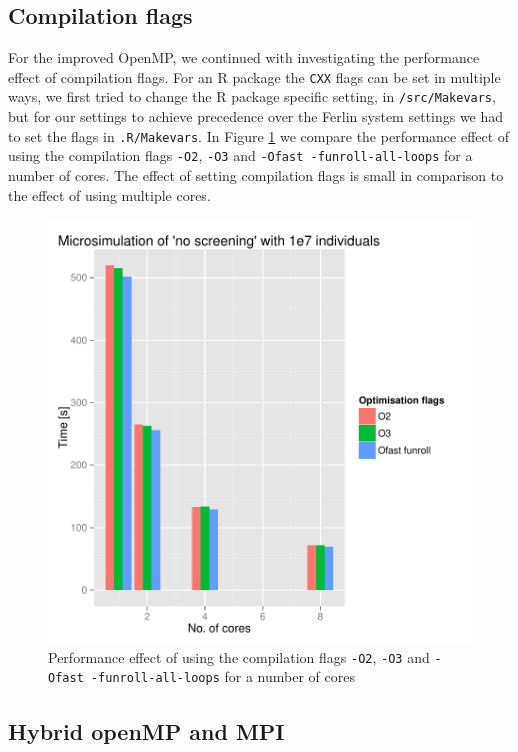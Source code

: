

\subsection{Compilation flags}

For the improved OpenMP, we continued with investigating the
performance effect of compilation flags. For an R package the \texttt{CXX}
flags can be set in multiple ways, we first tried to change the
R package specific setting, in \texttt{/src/Makevars}, but for our
settings to achieve precedence over the Ferlin system settings we had
to set the flags in \texttt{.R/Makevars}. In Figure
\ref{fig:flagScaling} we compare the performance effect of using
the compilation flags \texttt{-O2}, \texttt{-O3} and \texttt{-Ofast
  -funroll-all-loops} for a number of cores. The effect of setting
compilation flags is small in comparison to the effect of using
multiple cores.

\begin{figure}[!htbp] \centering
  \includegraphics[height=0.5\textheight]{images/flagsProfiling.pdf}
  \caption{Performance effect of using the compilation flags \texttt{-O2}, \texttt{-O3} and \texttt{-Ofast -funroll-all-loops} for a number of cores}
  \label{fig:flagScaling}
\end{figure}


\subsection{Hybrid openMP and MPI}



